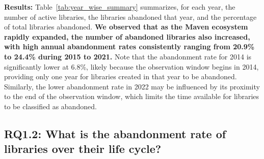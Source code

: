 \noindent \textbf{Results:} Table~\ref{tab:year_wise_summary} summarizes, for each year, the number of active libraries, the libraries abandoned that year, and the percentage of total libraries abandoned. \textbf{We observed that as the Maven ecosystem rapidly expanded, the number of abandoned libraries also increased, with high annual abandonment rates consistently ranging from 20.9\% to 24.4\% during 2015 to 2021.} Note that the abandonment rate for 2014 is significantly lower at 6.8\%, likely because the observation window begins in 2014, providing only one year for libraries created in that year to be abandoned. Similarly, the lower abandonment rate in 2022 may be influenced by its proximity to the end of the observation window, which limits the time available for libraries to be classified as abandoned.


\subsection{RQ1.2: What is the abandonment rate of libraries over their life cycle?}


